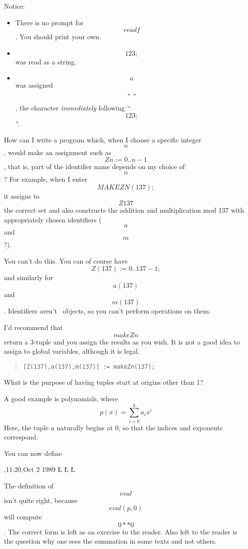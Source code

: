 \begin{description}
    Notice:
    \begin{itemize}
    \item There is no prompt for \[readf\].  You should print your own.
    \item \[123;\] was read as a string.
    \item \[a\] was assigned \["~"\], the character {\em immediately\/}
	following ``\[123;\]''.
    \end{itemize}



\Q  How can I write a program which, when I choose a specific integer \[n\],
    would make an assignment such as \[Zn:={0..n-1}\], that is, part of the
    identifier name depends on my choice of \[n\]?  For example, when I enter
    \[MAKEZN(137);\] it assigns to \[Z137\]
    the correct set and also constructs the
    addition and multiplication mod 137 with appropriately chosen
    identifiers (\[a\] and \[m\]?).

\A  You can't do this.  You can of course have \[Z(137):= {0..137-1};\]
    and similarly for \[a(137)\] and \[m(137)\].
    Identifiers aren't \ISETL\ objects,
    so you can't perform operations on them.

    I'd recommend that \[makeZn\] return a 3-tuple and you assign the
    results as you wish.  It is not a good idea to assign to global
    variables, although it is legal.

\begin{quote}\begin{verbatim}
[Z(137),a(137),m(137)] := makeZn(137);
\end{verbatim}\end{quote}


\Q What is the purpose of having tuples start at origins other than 1?

\A A good example is polynomials, where
$$ p(x) = \sum_{i=0}^k a_i x^i $$
Here, the tuple \(a\) naturally begins at 0, so that the indices and
exponents correspond.

You can now define

\begin{tgrind}
\File{},{11:20},{Oct  2 1989}
\L{}
\L{}
\CE{}\L{}
\end{tgrind}


The definition of \[eval\] isn't quite right, because \[eval(p,0)\]
will compute \[0**0\].  The correct form is left as an exercise to the
reader.  Also left to the reader is the question why one sees the
summation in some texts and not others.
\end{description}
